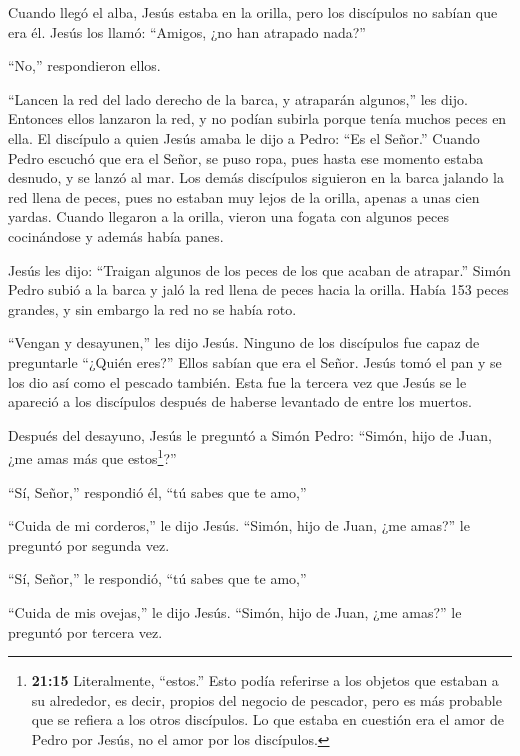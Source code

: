  Cuando llegó el alba, Jesús estaba en la orilla, pero los
discípulos no sabían que era él.  Jesús los llamó: ``Amigos,
¿no han atrapado nada?''

``No,'' respondieron ellos.

 ``Lancen la red del lado derecho de la barca, y atraparán
algunos,'' les dijo. Entonces ellos lanzaron la red, y no podían subirla
porque tenía muchos peces en ella.  El discípulo a quien
Jesús amaba le dijo a Pedro: ``Es el Señor.'' Cuando Pedro escuchó que
era el Señor, se puso ropa, pues hasta ese momento estaba desnudo, y se
lanzó al mar.  Los demás discípulos siguieron en la barca
jalando la red llena de peces, pues no estaban muy lejos de la orilla,
apenas a unas cien yardas.  Cuando llegaron a la orilla,
vieron una fogata con algunos peces cocinándose y además había panes.

 Jesús les dijo: ``Traigan algunos de los peces de los que
acaban de atrapar.''  Simón Pedro subió a la barca y jaló
la red llena de peces hacia la orilla. Había 153 peces grandes, y sin
embargo la red no se había roto.

 ``Vengan y desayunen,'' les dijo Jesús. Ninguno de los
discípulos fue capaz de preguntarle ``¿Quién eres?'' Ellos sabían que
era el Señor.  Jesús tomó el pan y se los dio así como el
pescado también.  Esta fue la tercera vez que Jesús se le
apareció a los discípulos después de haberse levantado de entre los
muertos.

 Después del desayuno, Jesús le preguntó a Simón Pedro:
``Simón, hijo de Juan, ¿me amas más que estos\footnote{\textbf{21:15}
  Literalmente, ``estos.'' Esto podía referirse a los objetos que
  estaban a su alrededor, es decir, propios del negocio de pescador,
  pero es más probable que se refiera a los otros discípulos. Lo que
  estaba en cuestión era el amor de Pedro por Jesús, no el amor por los
  discípulos.}?''

``Sí, Señor,'' respondió él, ``tú sabes que te amo,''

 ``Cuida de mi corderos,'' le dijo Jesús. ``Simón, hijo de
Juan, ¿me amas?'' le preguntó por segunda vez.

``Sí, Señor,'' le respondió, ``tú sabes que te amo,''

 ``Cuida de mis ovejas,'' le dijo Jesús. ``Simón, hijo de
Juan, ¿me amas?'' le preguntó por tercera vez.

